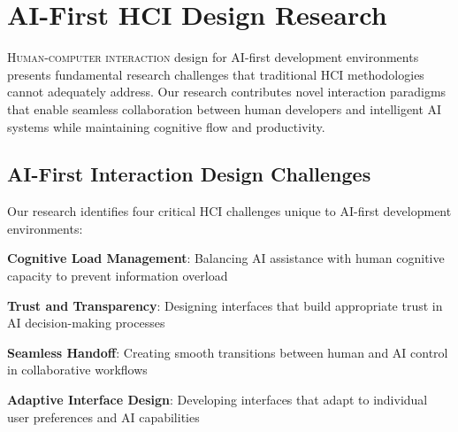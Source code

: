 
\section*{AI-First HCI Design Research}

\lettrine{H}{uman-computer interaction} design for AI-first development environments presents fundamental research challenges that traditional HCI methodologies cannot adequately address. Our research contributes novel interaction paradigms that enable seamless collaboration between human developers and intelligent AI systems while maintaining cognitive flow and productivity.

\subsection*{AI-First Interaction Design Challenges}

Our research identifies four critical HCI challenges unique to AI-first development environments:

\begin{expandedlist}
    \item \textbf{Cognitive Load Management}: Balancing AI assistance with human cognitive capacity to prevent information overload
    \item \textbf{Trust and Transparency}: Designing interfaces that build appropriate trust in AI decision-making processes
    \item \textbf{Seamless Handoff}: Creating smooth transitions between human and AI control in collaborative workflows
    \item \textbf{Adaptive Interface Design}: Developing interfaces that adapt to individual user preferences and AI capabilities
\end{expandedlist}

